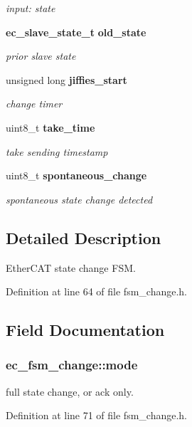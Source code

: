 \begin{DoxyCompactItemize}
\begin{DoxyCompactList}\small\item\em input\-: state \end{DoxyCompactList}\item 
{\bf ec\-\_\-slave\-\_\-state\-\_\-t} {\bf old\-\_\-state}\label{structec__fsm__change_a1327ecfcea3bdd858423750cf22783e6}

\begin{DoxyCompactList}\small\item\em prior slave state \end{DoxyCompactList}\item 
unsigned long {\bf jiffies\-\_\-start}\label{structec__fsm__change_aa357cf0cae0e5b306b6f555d48dc47ba}

\begin{DoxyCompactList}\small\item\em change timer \end{DoxyCompactList}\item 
uint8\-\_\-t {\bf take\-\_\-time}\label{structec__fsm__change_a86dd65308e2a0e1c89a96f35d2b5672f}

\begin{DoxyCompactList}\small\item\em take sending timestamp \end{DoxyCompactList}\item 
uint8\-\_\-t {\bf spontaneous\-\_\-change}\label{structec__fsm__change_a67f934c317235fc5ea71ee128f6a979b}

\begin{DoxyCompactList}\small\item\em spontaneous state change detected \end{DoxyCompactList}\end{DoxyCompactItemize}


\subsection{Detailed Description}
Ether\-C\-A\-T state change F\-S\-M. 

Definition at line 64 of file fsm\-\_\-change.\-h.



\subsection{Field Documentation}
\subsubsection[{mode}]{ ec\-\_\-fsm\-\_\-change\-::mode}\label{structec__fsm__change_a3565fb9fec03a24d1d3a66cce7e9fce3}


full state change, or ack only. 



Definition at line 71 of file fsm\-\_\-change.\-h.

